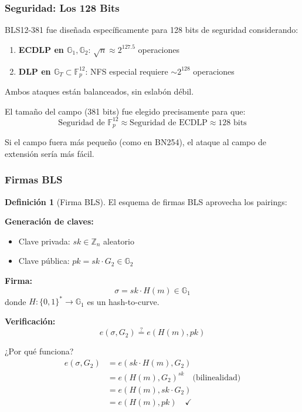 \documentclass[11pt,a4paper,twoside,openright]{book}
\theoremstyle{definition}
\newtheorem{definition}{Definición}[chapter]
\theoremstyle{plain}
\theoremstyle{remark}
\newcommand{\Fp}{\mathbb{F}_p}
\newcommand{\G}{\mathbb{G}}
\begin{document}
\subsubsection{Seguridad: Los 128 Bits}

\begin{keyidea}
BLS12-381 fue diseñada específicamente para 128 bits de seguridad considerando:
\begin{enumerate}
    \item \textbf{ECDLP en $\G_1, \G_2$}: $\sqrt{n} \approx 2^{127.5}$ operaciones
    \item \textbf{DLP en $\G_T \subset \Fp^{12}$}: NFS especial requiere $\sim 2^{128}$ operaciones
\end{enumerate}

Ambos ataques están balanceados, sin eslabón débil.
\end{keyidea}

\begin{mathnote}
El tamaño del campo (381 bits) fue elegido precisamente para que:
\[ \text{Seguridad de } \Fp^{12} \approx \text{Seguridad de ECDLP} \approx 128 \text{ bits} \]

Si el campo fuera más pequeño (como en BN254), el ataque al campo de extensión sería más fácil.
\end{mathnote}

\subsubsection{Firmas BLS}

\begin{definition}[Firma BLS]
El esquema de firmas BLS aprovecha los pairings:

\textbf{Generación de claves:}
\begin{itemize}
    \item Clave privada: $sk \in \mathbb{Z}_n$ aleatorio
    \item Clave pública: $pk = sk \cdot G_2 \in \G_2$
\end{itemize}

\textbf{Firma:}
\[ \sigma = sk \cdot H(m) \in \G_1 \]
donde $H: \{0,1\}^* \to \G_1$ es un hash-to-curve.

\textbf{Verificación:}
\[ e(\sigma, G_2) \stackrel{?}{=} e(H(m), pk) \]
\end{definition}

\begin{mathnote}
¿Por qué funciona?
\begin{align}
e(\sigma, G_2) &= e(sk \cdot H(m), G_2) \\
               &= e(H(m), G_2)^{sk} \quad \text{(bilinealidad)} \\
               &= e(H(m), sk \cdot G_2) \\
               &= e(H(m), pk) \quad \checkmark
\end{align}
\end{mathnote}
\end{document}
